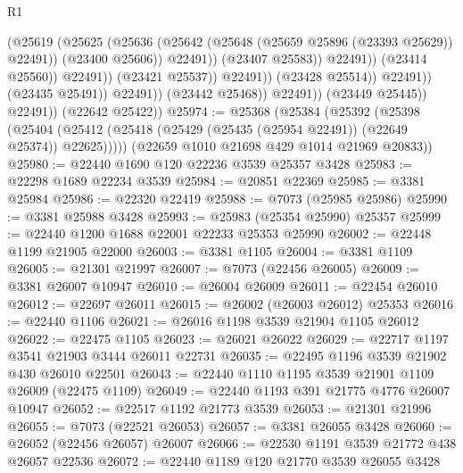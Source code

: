 \begin{lexlean}{R1}
\begin{coremodule}
                                                (@25619
                                                  (@25625
                                                    (@25636
                                                      (@25642
                                                        (@25648
                                                          (@25659 @25896 (@23393 @25629))
                                                          @22491))
                                                      (@23400 @25606))
                                                    @22491))
                                                (@23407 @25583))
                                              @22491))
                                          (@23414 @25560))
                                        @22491))
                                    (@23421 @25537))
                                  @22491))
                              (@23428 @25514))
                            @22491))
                        (@23435 @25491))
                      @22491))
                  (@23442 @25468))
                @22491))
            (@23449 @25445))
          @22491))
      (@22642 @25422))
@25974 := @25368
    (@25384
      (@25392
        (@25398
          (@25404 (@25412 (@25418 (@25429 (@25435 (@25954 @22491)) (@22649 @25374)) @22625)))))
      (@22659 @1010 @21698 @429 @1014 @21969 @20833))
@25980 := @22440 @1690 @120 @22236 @3539 @25357 @3428
@25983 := @22298 @1689 @22234 @3539
@25984 := @20851 @22369
@25985 := @3381 @25984
@25986 := @22320 @22419
@25988 := @7073 (@25985 @25986)
@25990 := @3381 @25988 @3428
@25993 := @25983 (@25354 @25990) @25357
@25999 := @22440 @1200 @1688 @22001 @22233 @25353 @25990
@26002 := @22448 @1199 @21905 @22000
@26003 := @3381 @1105
@26004 := @3381 @1109
@26005 := @21301 @21997
@26007 := @7073 (@22456 @26005)
@26009 := @3381 @26007 @10947
@26010 := @26004 @26009
@26011 := @22454 @26010
@26012 := @22697 @26011
@26015 := @26002 (@26003 @26012) @25353
@26016 := @22440 @1106
@26021 := @26016 @1198 @3539 @21904 @1105 @26012
@26022 := @22475 @1105
@26023 := @26021 @26022
@26029 := @22717 @1197 @3541 @21903 @3444 @26011 @22731
@26035 := @22495 @1196 @3539 @21902 @430 @26010 @22501
@26043 := @22440 @1110 @1195 @3539 @21901 @1109 @26009 (@22475 @1109)
@26049 := @22440 @1193 @391 @21775 @4776 @26007 @10947
@26052 := @22517 @1192 @21773 @3539
@26053 := @21301 @21996
@26055 := @7073 (@22521 @26053)
@26057 := @3381 @26055 @3428
@26060 := @26052 (@22456 @26057) @26007
@26066 := @22530 @1191 @3539 @21772 @438 @26057 @22536
@26072 := @22440 @1189 @120 @21770 @3539 @26055 @3428

\end{coremodule}
\end{lexlean}
